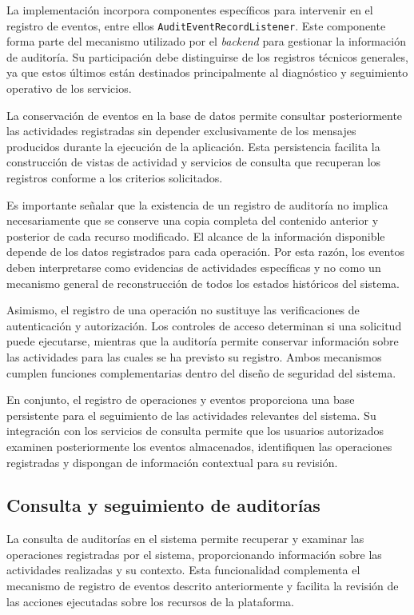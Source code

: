 La implementación incorpora componentes específicos para intervenir en el registro de eventos, entre ellos \texttt{AuditEventRecordListener}. Este componente forma parte del mecanismo utilizado por el \textit{backend} para gestionar la información de auditoría. Su participación debe distinguirse de los registros técnicos generales, ya que estos últimos están destinados principalmente al diagnóstico y seguimiento operativo de los servicios.

La conservación de eventos en la base de datos permite consultar posteriormente las actividades registradas sin depender exclusivamente de los mensajes producidos durante la ejecución de la aplicación. Esta persistencia facilita la construcción de vistas de actividad y servicios de consulta que recuperan los registros conforme a los criterios solicitados.

Es importante señalar que la existencia de un registro de auditoría no implica necesariamente que se conserve una copia completa del contenido anterior y posterior de cada recurso modificado. El alcance de la información disponible depende de los datos registrados para cada operación. Por esta razón, los eventos deben interpretarse como evidencias de actividades específicas y no como un mecanismo general de reconstrucción de todos los estados históricos del sistema.

Asimismo, el registro de una operación no sustituye las verificaciones de autenticación y autorización. Los controles de acceso determinan si una solicitud puede ejecutarse, mientras que la auditoría permite conservar información sobre las actividades para las cuales se ha previsto su registro. Ambos mecanismos cumplen funciones complementarias dentro del diseño de seguridad del sistema.

En conjunto, el registro de operaciones y eventos proporciona una base persistente para el seguimiento de las actividades relevantes del sistema. Su integración con los servicios de consulta permite que los usuarios autorizados examinen posteriormente los eventos almacenados, identifiquen las operaciones registradas y dispongan de información contextual para su revisión.


\subsection{Consulta y seguimiento de auditorías}
\label{subsec:consulta-seguimiento-auditorias}

La consulta de auditorías en el sistema permite recuperar y examinar las operaciones registradas por el sistema, proporcionando información sobre las actividades realizadas y su contexto. Esta funcionalidad complementa el mecanismo de registro de eventos descrito anteriormente y facilita la revisión de las acciones ejecutadas sobre los recursos de la plataforma.


